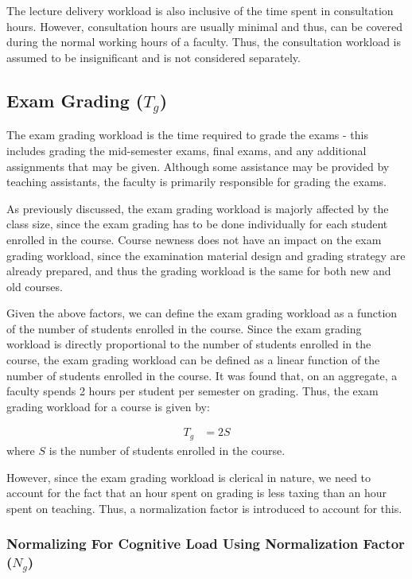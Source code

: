The lecture delivery workload is also inclusive of the time spent in consultation hours. However, consultation hours are usually minimal and thus, can be covered during the normal working hours of a faculty. Thus, the consultation workload is assumed to be insignificant and is not considered separately.

\subsection{Exam Grading (\texorpdfstring{\(T_g\)}{})}
\label{sec:exam_grading}

The exam grading workload is the time required to grade the exams - this includes grading the mid-semester exams, final exams, and any additional assignments that may be given. Although some assistance may be provided by teaching assistants, the faculty is primarily responsible for grading the exams.

As previously discussed, the exam grading workload is majorly affected by the class size, since the exam grading has to be done individually for each student enrolled in the course. Course newness does not have an impact on the exam grading workload, since the examination material design and grading strategy are already prepared, and thus the grading workload is the same for both new and old courses.

Given the above factors, we can define the exam grading workload as a function of the number of students enrolled in the course. Since the exam grading workload is directly proportional to the number of students enrolled in the course, the exam grading workload can be defined as a linear function of the number of students enrolled in the course. It was found that, on an aggregate, a faculty spends 2 hours per student per semester on grading. Thus, the exam grading workload for a course is given by:

\begin{equation*}
  \begin{aligned}
    T_g & = 2 S
  \end{aligned}
\end{equation*}
where \(S\) is the number of students enrolled in the course.

However, since the exam grading workload is clerical in nature, we need to account for the fact that an hour spent on grading is less taxing than an hour spent on teaching. Thus, a normalization factor is introduced to account for this.

\subsubsection{Normalizing For Cognitive Load Using Normalization Factor (\(N_g\))}


